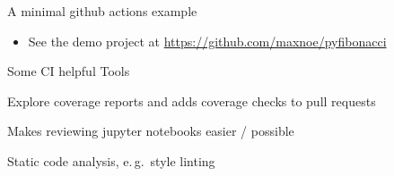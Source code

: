 \begin{frame}[c]{A minimal github actions example}
  \begin{itemize}
    \item See the demo project at \url{https://github.com/maxnoe/pyfibonacci}
  \end{itemize}
\end{frame}


\begin{frame}[c]{Some CI helpful Tools}
  \begin{description}
    \item[\url{https://codecov.io/}] Explore coverage reports and adds coverage checks to pull requests
    \item[\url{https://reviewnb.com/}] Makes reviewing jupyter notebooks easier / possible
    \item[\url{https://codacy.com/}] Static code analysis, e.\,g.\ style linting
  \end{description}
\end{frame}

